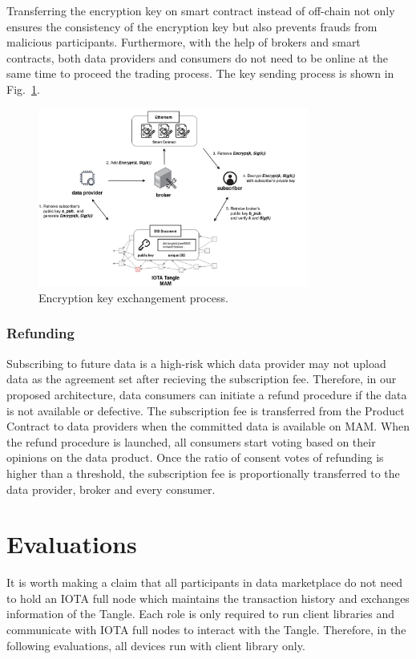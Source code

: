\documentclass[conference]{IEEEtran}
\begin{document}
Transferring the encryption key on smart contract instead of off-chain not only ensures the consistency of the encryption key but also prevents frauds from malicious participants. Furthermore, with the help of brokers and smart contracts, both data providers and consumers do not need to be online at the same time to proceed the trading process. The key sending process is shown in Fig.~\ref{fig:key_exchange}. 

\begin{figure}[!t]
    \centering
    \includegraphics[width=3.5in]{key_exchange}
    \caption{Encryption key exchangement process.}
    \label{fig:key_exchange}
\end{figure}

\subsubsection{Refunding}
Subscribing to future data is a high-risk which data provider may not upload data as the agreement set after recieving the subscription fee. Therefore, in our proposed architecture, data consumers can initiate a refund procedure if the data is not available or defective. The subscription fee is transferred from the Product Contract to data providers when the committed data is available on MAM. When the refund procedure is launched, all consumers start voting based on their opinions on the data product. Once the ratio of consent votes of refunding is higher than a threshold, the subscription fee is proportionally transferred to the data provider, broker and every consumer. 


\section{Evaluations}
It is worth making a claim that all participants in data marketplace do not need to hold an IOTA full node which maintains the transaction history and exchanges information of the Tangle. Each role is only required to run client libraries and communicate with IOTA full nodes to interact with the Tangle. Therefore, in the following evaluations, all devices run with client library only.
\end{document}
